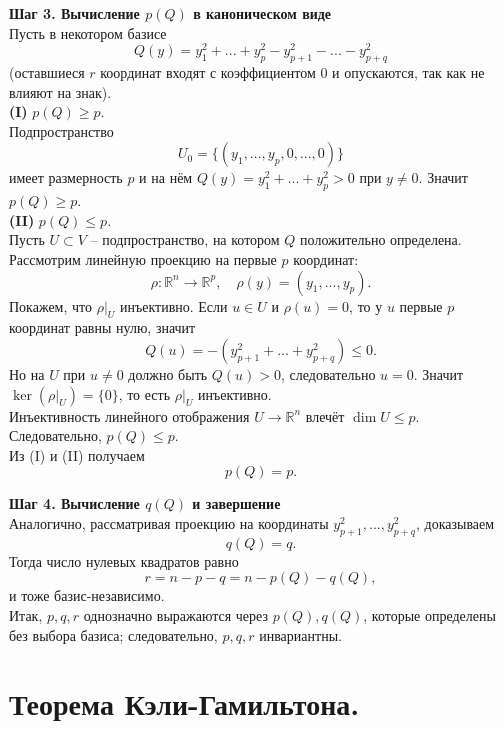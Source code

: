 \documentclass[14pt]{extreport}
\begin{document}
\begin{prbox}
        \textbf{Шаг 3. Вычисление $p(Q)$ в каноническом виде}\\
        Пусть в некотором базисе
        \[
        Q(y) = y_1^2 + ... + y_p^2 - y_{p+1}^2 - ... - y_{p+q}^2
        \]
        (оставшиеся $r$ координат входят с коэффициентом $0$ и опускаются, так как не влияют на знак).\\
        \textbf{(I)} $p(Q) \geq p$.\\
        Подпространство
        \[
        U_0 = \{ (y_1,...,y_p,0,...,0) \}
        \]
        имеет размерность $p$ и на нём $Q(y) = y_1^2 + ... + y_p^2 > 0$ при $y \neq 0$. Значит $p(Q) \geq p$.\\
        \textbf{(II)} $p(Q) \leq p$.\\
        Пусть $U \subset V$ – подпространство, на котором $Q$ положительно определена. Рассмотрим линейную проекцию на первые $p$ координат:
        \[
        \rho: \mathbb{R}^n \rightarrow \mathbb{R}^p, \quad \rho(y) = (y_1,...,y_p).
        \]
        Покажем, что $\rho|_U$ инъективно. Если $u \in U$ и $\rho(u) = 0$, то у $u$ первые $p$ координат равны нулю, значит
        \[
        Q(u) = -(y_{p+1}^2 + ... + y_{p+q}^2) \leq 0.
        \]
        Но на $U$ при $u \neq 0$ должно быть $Q(u) > 0$, следовательно $u=0$. Значит $\ker(\rho|_U) = \{0\}$, то есть $\rho|_U$ инъективно.\\
        Инъективность линейного отображения $U \rightarrow \mathbb{R}^n$ влечёт $\dim U \leq p$. Следовательно, $p(Q) \leq p$.\\
        Из (I) и (II) получаем
        \[
        p(Q) = p.
        \]

        \textbf{Шаг 4. Вычисление $q(Q)$ и завершение}\\
        Аналогично, рассматривая проекцию на координаты $y_{p+1}^2, ..., y_{p+q}^2$, доказываем
        \[
        q(Q) = q.
        \]
        Тогда число нулевых квадратов равно
        \[
        r = n - p - q = n - p(Q) - q(Q),
        \]
        и тоже базис-независимо.\\
        Итак, $p,q,r$ однозначно выражаются через $p(Q), q(Q)$, которые определены без выбора базиса; следовательно, $p,q,r$ инвариантны.
    \end{prbox}



    \chapter{Теорема Кэли-Гамильтона.}
\end{document}
